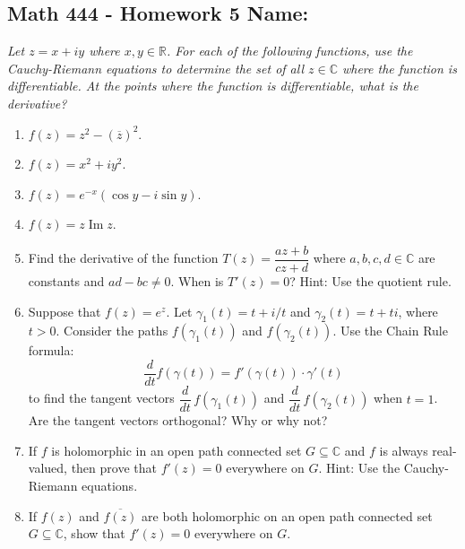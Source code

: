 \documentclass[11pt]{article}
\newcommand{\R}{\mathbb{R}}
\newcommand{\C}{\mathbb{C}}
\newcommand{\im}{\operatorname{Im}}
\begin{document}
\pagestyle{empty}
\subsection*{Math 444 - Homework 5 \hfill Name: \underline{\hspace*{2in}}}
\noindent
\textit{Let $z = x+iy$ where $x, y \in \R$.  For each of the following functions, use the Cauchy-Riemann equations to determine the set of all $z \in \C$ where the function is differentiable. At the points where the function is differentiable, what is the derivative?}

\begin{enumerate}
\item $f(z) = z^2 - (\overline{z})^2$. 
\vfill

\item $f(z) = x^2 + i y^2$.
\vfill 


\item $f(z) = e^{-x} (\cos y - i \sin y)$.
\vfill

\item $f(z) = z \im{z}$.
\vfill

\item Find the derivative of the function $T(z) = \dfrac{az+b}{cz+d}$ where $a,b,c,d \in \C$ are constants and $ad  - bc \ne 0$. When is $T'(z) = 0$? Hint: Use the quotient rule. 
\vfill


\newpage
\item Suppose that $f(z) = e^z$. Let $\gamma_1(t) = t + i/t$ and $\gamma_2(t) = t + ti$, where $t > 0$. Consider the paths $f(\gamma_1(t))$ and $f(\gamma_2(t))$.  
Use the Chain Rule formula: 
$$\frac{d}{dt} f(\gamma(t)) = f'(\gamma(t)) \cdot \gamma'(t)$$
to find the tangent vectors $\dfrac{d}{dt} \, f(\gamma_1(t))$ and $\dfrac{d}{dt} \, f(\gamma_2(t))$ when $t=1$.  Are the tangent vectors orthogonal? Why or why not?
\vfill

\item If $f$ is holomorphic in an open path connected set $G \subseteq \C$ and $f$ is always real-valued, then prove that $f'(z) = 0$ everywhere on $G$.  Hint: Use the Cauchy-Riemann equations. 
\vfill
\vfill

\item If $f(z)$ and $\overline{f(z)}$ are both holomorphic on an open path connected set $G \subseteq \C$, show that $f'(z) = 0$ everywhere on $G$. 
\vfill
\vfill

\end{enumerate}
\end{document}
